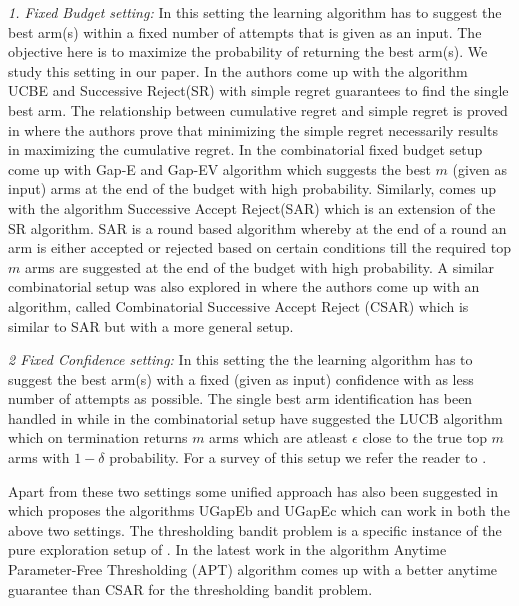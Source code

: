 	\emph{1. Fixed Budget setting:} In this setting the learning algorithm has to suggest the best arm(s) within a fixed number of attempts that is given as an input. The objective here is to maximize the probability of returning the best arm(s).  We study this setting in our paper. In \cite{audibert2010best} the authors come up with the algorithm UCBE and Successive Reject(SR) with simple regret guarantees to find the single best arm. The relationship between cumulative regret and simple regret is proved in \cite{bubeck2011pure} where the authors prove that minimizing the simple regret necessarily results in maximizing the cumulative regret. In the combinatorial fixed budget setup \cite{gabillon2011multi} come up with Gap-E and Gap-EV algorithm which suggests the best $m$ (given as input) arms at the end of the budget with high probability. Similarly, \cite{bubeck2013multiple} comes up with the algorithm Successive Accept Reject(SAR) which is an extension of the SR algorithm. SAR is a round based algorithm whereby at the end of a round an arm is either accepted or rejected based on certain conditions till the required top $m$ arms are suggested at the end of the budget with high probability. A similar combinatorial setup was also explored in \cite{chen2014combinatorial} where the authors come up with an algorithm, called Combinatorial Successive Accept Reject (CSAR) which is similar to SAR but with a more general setup. 

	\emph{2 Fixed Confidence setting:} In this setting the the learning algorithm has to suggest the best arm(s) with a fixed (given as input) confidence with as less number of attempts as possible. The single best arm identification has been handled in \cite{even2006action} while in the combinatorial setup \cite{kalyanakrishnan2012pac} have suggested the LUCB algorithm which on termination returns $m$ arms which are atleast $\epsilon$ close to the true top $m$ arms with $1-\delta$ probability. For a survey of this setup we refer the reader to \cite{jamieson2014best}. 

	Apart from these two settings some unified approach has also been suggested in \cite{gabillon2012best} which proposes the algorithms UGapEb and UGapEc which can work in both the above two settings. The thresholding bandit problem is a specific instance of the pure exploration setup of \cite{chen2014combinatorial}. In the latest work in \cite{locatelli2016optimal} the algorithm Anytime Parameter-Free Thresholding (APT) algorithm comes up with a better anytime guarantee than CSAR for the thresholding bandit problem.	
	
